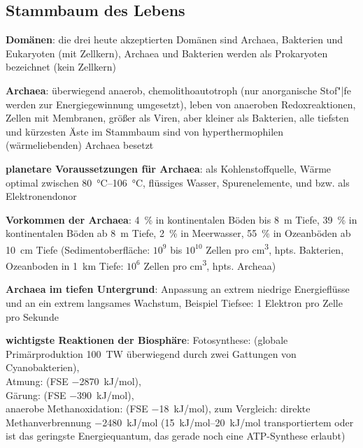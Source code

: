 \pagebreak

\subsection{%
    Stammbaum des Lebens%
}

\textbf{Domänen}:
die drei heute akzeptierten Domänen sind Archaea, Bakterien und Eukaryoten (mit Zellkern),
Archaea und Bakterien werden als Prokaryoten bezeichnet (kein Zellkern)

\textbf{Archaea}:
überwiegend anaerob,
chemolithoautotroph (nur anorganische Stof"|fe werden zur Energiegewinnung umgesetzt),
leben von anaeroben Redoxreaktionen,
Zellen mit Membranen,
größer als Viren, aber kleiner als Bakterien,
alle tiefsten und kürzesten Äste im Stammbaum sind von hyperthermophilen (wärmeliebenden)
Archaea besetzt

\textbf{planetare Voraussetzungen für Archaea}:
 als Kohlenstoffquelle,
Wärme optimal zwischen \SIrange{80}{106}{\celsius},
flüssiges Wasser,
Spurenelemente,
 und  bzw.  als Elektronendonor

\textbf{Vorkommen der Archaea}:
\SI{4}{\percent} in kontinentalen Böden bis \SI{8}{\meter} Tiefe,
\SI{39}{\percent} in kontinentalen Böden ab \SI{8}{\meter} Tiefe,
\SI{2}{\percent} in Meerwasser,
\SI{55}{\percent} in Ozeanböden ab \SI{10}{\centi\meter} Tiefe
(Sedimentoberfläche: $10^9$ bis $10^{10}$ Zellen pro \si{\centi\meter\cubed}, hpts. Bakterien,
Ozeanboden in \SI{1}{\kilo\meter} Tiefe: $10^6$ Zellen pro \si{\centi\meter\cubed}, hpts. Archeaa)

\textbf{Archaea im tiefen Untergrund}:
Anpassung an extrem niedrige Energieflüsse und an ein extrem langsames Wachstum,
Beispiel Tiefsee: 1 Elektron pro Zelle pro Sekunde

\textbf{wichtigste Reaktionen der Biosphäre}:
Fotosynthese:  (globale Primärproduktion \SI{100}{\tera\watt}
überwiegend durch zwei Gattungen von Cyanobakterien),\\
Atmung:  (FSE \SI{-2870}{\kilo\joule/\mol}),\\
Gärung:  (FSE \SI{-390}{\kilo\joule/\mol}),\\
anaerobe Methanoxidation: 
(FSE \SI{-18}{\kilo\joule/\mol}),
zum Vergleich: direkte Methanverbrennung \SI{-2480}{\kilo\joule/\mol}
(\SIrange{+15}{20}{\kilo\joule/\mol} transportiertem  oder  ist
das geringste Energiequantum, das gerade noch eine ATP-Synthese erlaubt)

